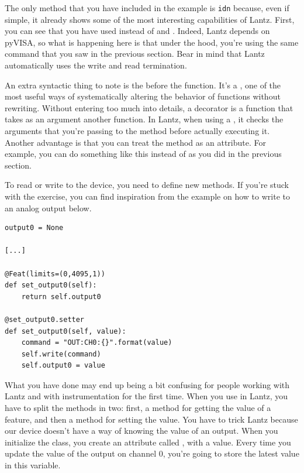The only method that you have included in the example is \texttt{idn} because, even if simple, it already shows some of the most interesting capabilities of Lantz. First, you can see that you have used  instead of  and . Indeed, Lantz depends on pyVISA, so what is happening here is that under the hood, you're using the same command that you saw in the previous section. Bear in mind that Lantz automatically uses the write and read termination.

An extra syntactic thing to note is the  before the function. It's a , one of the most useful ways of systematically altering the behavior of functions without rewriting. Without entering too much into details, a decorator is a function that takes as an argument another function. In Lantz, when using a , it checks the arguments that you're passing to the method before actually executing it. Another advantage is that you can treat the method as an attribute. For example, you can do something like this  instead of  as you did in the previous section.


To read or write to the device, you need to define new methods. If you're stuck with the exercise, you can find inspiration from the example on how to write to an analog output below.

\begin{verbatim}
output0 = None

[...]

@Feat(limits=(0,4095,1))
def set_output0(self):
    return self.output0

@set_output0.setter
def set_output0(self, value):
    command = "OUT:CH0:{}".format(value)
    self.write(command)
    self.output0 = value
\end{verbatim}

What you have done may end up being a bit confusing for people working with Lantz and with instrumentation for the first time. When you use  in Lantz, you have to split the methods in two: first, a method for getting the value of a feature, and then a method for setting the value. You have to trick Lantz because our device doesn't have a way of knowing the value of an output. When you initialize the class, you create an attribute called , with a  value. Every time you update the value of the output on channel 0, you're going to store the latest value in this variable.

